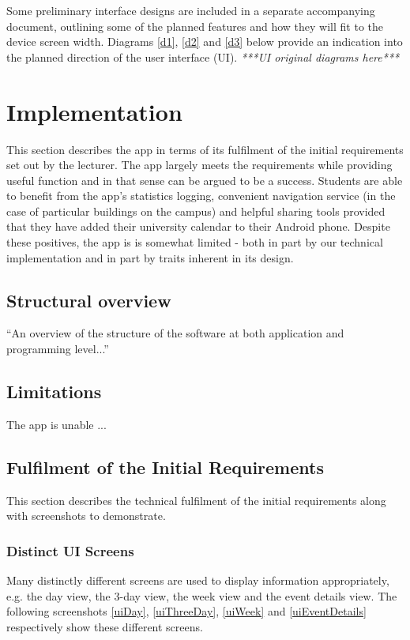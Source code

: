 \documentclass{article}
\begin{document}
Some preliminary interface designs are included in a separate accompanying document, outlining some of the planned features and how they will fit to the device screen width. Diagrams \ref{d1}, \ref{d2} and \ref{d3} below provide an indication into the planned direction of the user interface (UI).
\newline
\noindent\emph{***UI original diagrams here***}

\section{Implementation}
This section describes the app in terms of its fulfilment of the initial requirements set out by the lecturer. The app largely meets the requirements while providing useful function and in that sense can be argued to be a success. Students are able to benefit from the app's statistics logging, convenient navigation service (in the case of particular buildings on the campus) and helpful sharing tools provided that they have added their university calendar to their Android phone. Despite these positives, the app is is somewhat limited - both in part by our technical implementation and in part by traits inherent in its design. 

\subsection{Structural overview}
``An overview of the structure of the software at both application and programming level...''

\subsection{Limitations}
The app is unable  ...

\subsection{Fulfilment of the Initial Requirements}
This section describes the technical fulfilment of the initial requirements along with screenshots to demonstrate.

\subsubsection{Distinct UI Screens}
Many distinctly different screens are used to display information appropriately, e.g. the day view, the 3-day view, the week view and the event details view. The following screenshots \ref{uiDay}, \ref{uiThreeDay}, \ref{uiWeek} and \ref{uiEventDetails} respectively show these different screens.
\end{document}

